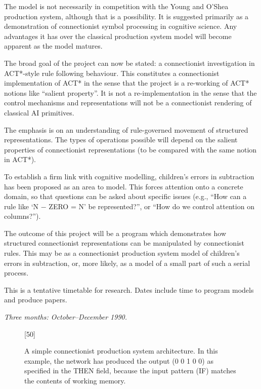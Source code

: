 The model is not necessarily in competition with the Young and
O'Shea production system, although that is a possibility.  It
is suggested primarily as a demonstration of connectionist
symbol processing in cognitive science.  Any advantages it has
over the classical production system model will become
apparent as the model matures.


The broad goal of the project can now be stated: a
connectionist investigation in ACT*-style rule following behaviour.
This constitutes a connectionist implementation of ACT* in the
sense that the project is a re-working of ACT* notions like ``salient
property''.  It is not a re-implementation in the sense that
the control mechanisms and representations will not be
a connectionist rendering of classical AI primitives.

The emphasis is on an understanding of rule-governed
movement of structured representations.  The types of
operations possible will depend on the salient properties of
connectionist representations (to be compared with the
same notion in ACT*).

To establish a firm link with cognitive modelling, children's
errors in subtraction has been proposed as an area to model. This
forces attention onto a concrete domain, so that questions
can be asked about specific issues (e.g., ``How can a rule
like `N $-$ ZERO = N' be represented?'', or ``How do we control
attention on columns?'').

The outcome of this project will be a program which demonstrates how
structured connectionist representations can be manipulated by
connectionist rules.  This may be as a connectionist production system
model of children's errors in subtraction, or, more likely, as a model
of a small part of such a serial process.


This is a tentative timetable for research.  Dates include time
to program models and produce papers.

\def\headpar#1{\medskip\noindent{\bf#1}}
\def\dur#1{{\em#1}\medskip}

\headpar{Immediate future.}
\dur{Three months: October--December 1990.}

\begin{figure}
[50]
\vspace{2.9 in}
\caption{A simple connectionist production system architecture. In
this example, the network has produced the output (0 0 1 0 0)
as specified in the THEN field, because
the input pattern (IF) matches the contents of working memory.}
\label{sps}
\end{figure}

